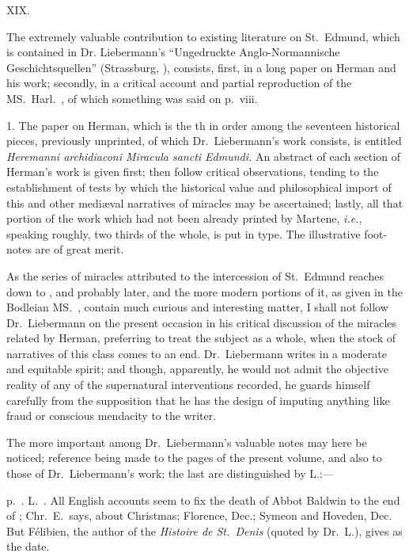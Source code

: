 \documentclass[10pt]{book}
\begin{document}
{\vspace{.3cm}
\begin{center}
XIX.
\end{center}
\noindent The extremely valuable contribution to existing literature on St.\ Edmund, which is contained in Dr. Liebermann's ``Ungedruckte Anglo-Normannische Geschichtsquellen'' (Strassburg, ), consists, first, in a long paper on Herman and his work; secondly, in a critical account and partial reproduction of the MS.\ Harl.\ , of which something was said on p.\ viii.

1. The paper on Herman, which is the th in order among the seventeen historical pieces, previously unprinted, of which Dr.\ Liebermann's work consists, is entitled \emph{Heremanni archidiaconi Miracula sancti Edmundi.} An abstract of each section of Herman's work is given first; then follow critical observations, tending to the establishment of tests by which the historical value and philosophical import of this and other medi\ae{}val narratives of miracles may be ascertained; lastly, all that portion of the work which had not been already printed by Martene, \emph{i.e.}, speaking roughly, two thirds of the whole, is put in type. The illustrative foot-notes are of great merit.

As the series of miracles attributed to the intercession of St.\ Edmund reaches down to , and probably later, and the more modern portions of it, as given in the Bodleian MS.\ , contain much curious and interesting matter, I shall not follow Dr.\ Liebermann on the present occasion in his critical discussion of the miracles related by Herman, preferring to treat the subject as a whole, when the stock of narratives of this class comes to an end. Dr.\ Liebermann writes in a moderate and equitable spirit; and though, apparently, he would not admit the objective reality of any of the supernatural interventions recorded, he guards himself carefully from the supposition that he has the design of imputing anything like fraud or conscious mendacity to the writer.

The more important among Dr.\ Liebermann's valuable notes may here be noticed; reference being made to the pages of the present volume, and also to those of Dr.\ Liebermann's work; the last are distinguished by L.:---

p.\ . L.\ . All English accounts seem to fix the death of Abbot Baldwin to the end of ; Chr.\ E.\ says, about Christmas; Florence,  Dec.; Symeon and Hoveden,  Dec. But Félibien, the author of the \emph{Histoire de St.\ Denis} (quoted by Dr.\ L.), gives  as the date.

}
\end{document}
